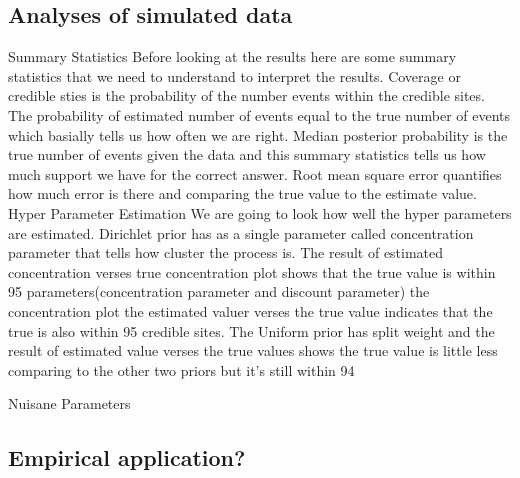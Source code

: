 \subsection{Analyses of simulated data}

Summary Statistics
Before looking at the results here are some summary statistics that we need to 
understand to interpret the results. Coverage or credible sties is the probability
of the number events within the credible sites. The probability of estimated number 
of events equal to the true number of events which basially tells us how often we 
are right. Median posterior probability is the true number of events given the data 
and this summary statistics tells us how much support we have for the correct answer.
Root mean square error quantifies how much error is there and comparing the true 
value to the estimate value. 
Hyper Parameter Estimation 
We are going to look how well the hyper parameters are estimated. Dirichlet
prior has as a single parameter called concentration parameter that tells how cluster 
the process is. The result of estimated concentration verses true concentration plot
shows that the true value is within 95%
parameters(concentration parameter and discount parameter) the concentration plot 
the estimated valuer verses the true value indicates that the true is also within 95%
credible sites. The Uniform prior has split weight and the result of estimated value 
verses the true values shows the true value is little less comparing to the other two 
priors but it's still within 94%


    


Nuisane Parameters






\subsection{Empirical application?}

